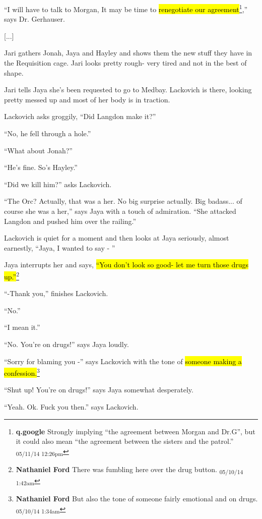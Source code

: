 ``I will have to talk to Morgan, It may be time to \hl{renegotiate our agreement}\footnote{\textbf{q.google }Strongly implying ``the agreement between Morgan and Dr.G'', but it could also mean ``the agreement between the sisters and the patrol.'' \textsubscript{05/11/14 12:26pm}},'' says Dr. Gerhauser.

{[}...{]}



Jari gathers Jonah, Jaya and Hayley and shows them the new stuff they have in the Requisition cage.  Jari looks pretty rough- very tired and not in the best of shape.



Jari tells Jaya she's been requested to go to Medbay.  Lackovich is there, looking pretty messed up and most of her body is in traction.

Lackovich asks groggily, ``Did Langdon make it?''

``No, he fell through a hole.''

``What about Jonah?''

``He's fine.  So's Hayley.''

``Did we kill him?'' asks Lackovich.

``The Orc?  Actually, that was a her.  No big surprise actually.  Big badass... of course she was a her,'' says Jaya with a touch of admiration.  ``She attacked Langdon and pushed him over the railing.''

Lackovich is quiet for a moment and then looks at Jaya seriously, almost earnestly, ``Jaya, I wanted to say - ''

Jaya interrupts her and says, \hl{``You don't look so good- let me turn those drugs up.''}\footnote{\textbf{Nathaniel Ford }There was fumbling here over the drug button. \textsubscript{05/10/14 1:42am}}

``-Thank you,'' finishes Lackovich.

``No.''

``I mean it.''

``No.  You're on drugs!'' says Jaya loudly.

``Sorry for blaming you -'' says Lackovich with the tone of \hl{someone making a confession.}\footnote{\textbf{Nathaniel Ford }But also the tone of someone fairly emotional and on drugs. \textsubscript{05/10/14 1:34am}}

``Shut up! You're on drugs!'' says Jaya somewhat desperately.

``Yeah.  Ok.  Fuck you then.'' says Lackovich.

